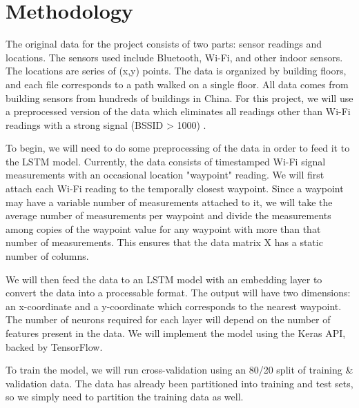 \documentclass[a4paper]{article}
\begin{document}
\section{Methodology}

The original data for the project consists of two parts: sensor readings and locations. The sensors used include Bluetooth, Wi-Fi, and other indoor sensors. The locations are series of (x,y) points. The data is organized by building floors, and each file corresponds to a path walked on a single floor. All data comes from building sensors from hundreds of buildings in China. For this project, we will use a preprocessed version of the data which eliminates all readings other than Wi-Fi readings with a strong signal (BSSID > 1000)  \cite{anzelmo_indoor}.

To begin, we will need to do some preprocessing of the data in order to feed it to the LSTM model. Currently, the data consists of timestamped Wi-Fi signal measurements with an occasional location "waypoint" reading. We will first attach each Wi-Fi reading to the temporally closest waypoint. Since a waypoint may have a variable number of measurements attached to it, we will take the average number of measurements per waypoint and divide the measurements among copies of the waypoint value for any waypoint with more than that number of measurements. This ensures that the data matrix X has a static number of columns.

We will then feed the data to an LSTM model with an embedding layer to convert the data into a processable format. The output will have two dimensions: an x-coordinate and a y-coordinate which corresponds to the nearest waypoint. The number of neurons required for each layer will depend on the number of features present in the data. We will implement the model using the Keras API, backed by TensorFlow.

To train the model, we will run cross-validation using an 80/20 split of training \& validation data. The data has already been partitioned into training and test sets, so we simply need to partition the training data as well.



\end{document}
